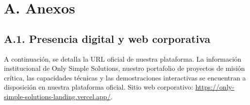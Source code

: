 \documentclass[11pt]{article}
\begin{document}
\hypersetup{pageanchor=false}
\hypersetup{pageanchor=true}
\tableofcontents
\clearpage

\section{A. Anexos}\label{a-anexos}

\subsection{A.1. Presencia digital y web corporativa}\label{a1-presencia-digital-y-web-corporativa}

A continuación, se detalla la URL oficial de nuestra plataforma. La información institucional de Only Simple Solutions, nuestro portafolio de proyectos de misión crítica, las capacidades técnicas y las demostraciones interactivas se encuentran a disposición en nuestra plataforma oficial. Sitio web corporativo: \url{https://only-simple-solutions-landing.vercel.app/}.

\ossFinalPage
\end{document}
